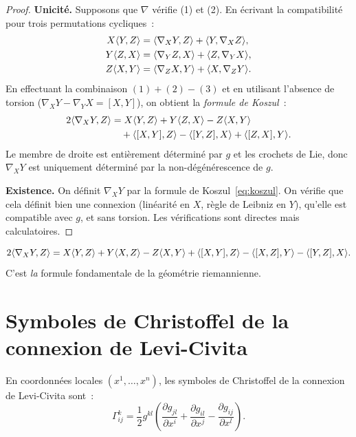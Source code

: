 \begin{proof}
\textbf{Unicit\'e.} Supposons que $\nabla$ v\'erifie (1) et (2). En \'ecrivant la
compatibilit\'e pour trois permutations cycliques~:
\begin{align*}
    X\langle Y, Z \rangle &= \langle \nabla_X Y, Z \rangle + \langle Y, \nabla_X Z \rangle, \\
    Y\langle Z, X \rangle &= \langle \nabla_Y Z, X \rangle + \langle Z, \nabla_Y X \rangle, \\
    Z\langle X, Y \rangle &= \langle \nabla_Z X, Y \rangle + \langle X, \nabla_Z Y \rangle.
\end{align*}
En effectuant la combinaison $(1) + (2) - (3)$ et en utilisant l'absence de torsion
($\nabla_X Y - \nabla_Y X = [X,Y]$), on obtient la \emph{formule de Koszul}~:
\begin{align}
    2\langle \nabla_X Y, Z \rangle &= X\langle Y, Z \rangle + Y\langle Z, X \rangle - Z\langle X, Y \rangle
    \notag \\
    &\quad + \langle [X,Y], Z \rangle - \langle [Y,Z], X \rangle + \langle [Z,X], Y \rangle.
    \label{eq:koszul}
\end{align}
Le membre de droite est enti\`erement d\'etermin\'e par $g$ et les crochets de Lie,
donc $\nabla_X Y$ est uniquement d\'etermin\'e par la non-d\'eg\'en\'erescence de $g$.

\textbf{Existence.} On d\'efinit $\nabla_X Y$ par la formule de Koszul~\eqref{eq:koszul}.
On v\'erifie que cela d\'efinit bien une connexion (lin\'earit\'e en $X$, r\`egle de Leibniz
en $Y$), qu'elle est compatible avec $g$, et sans torsion. Les v\'erifications sont
directes mais calculatoires.
\end{proof}

\begin{formules}[title=\textbf{Formule de Koszul}]
\[
    2\langle \nabla_X Y, Z \rangle = X\langle Y, Z \rangle + Y\langle X, Z \rangle - Z\langle X, Y \rangle
    + \langle [X,Y], Z \rangle - \langle [X,Z], Y \rangle - \langle [Y,Z], X \rangle.
\]
C'est \emph{la} formule fondamentale de la g\'eom\'etrie riemannienne.
\end{formules}

\section{Symboles de Christoffel de la connexion de Levi-Civita}

\begin{proposition}
En coordonn\'ees locales $(x^1, \ldots, x^n)$, les symboles de Christoffel de
la connexion de Levi-Civita sont~:
\[
    \Gamma^k_{ij} = \frac{1}{2} g^{kl}
    \left(\frac{\partial g_{jl}}{\partial x^i}
    + \frac{\partial g_{il}}{\partial x^j}
    - \frac{\partial g_{ij}}{\partial x^l}\right).
\]
\end{proposition}

